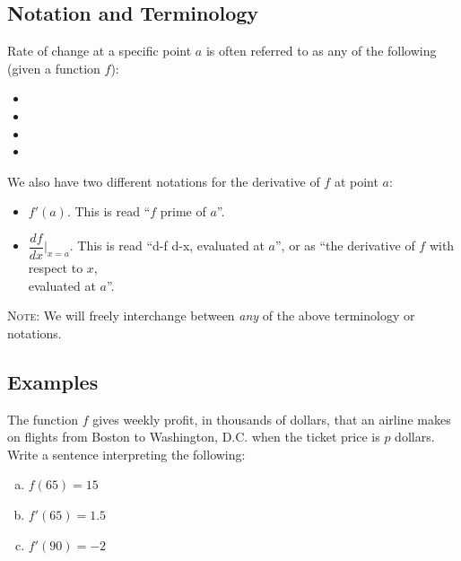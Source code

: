 \documentclass[notes]{subfiles}
\begin{document}
	\subsection*{Notation and Terminology}
		Rate of change at a specific point $a$ is often referred to as any of the following (given a function $f$):\\
			\begin{itemize}
				\item {}
				\item {}
				\item {}
				\item {}
			\end{itemize}
		We also have two different notations for the derivative of $f$ at point $a$:
			\begin{itemize}
				\item $f'(a)$.  This is read ``$f$ prime of $a$''.
				\item $\dfrac{df}{dx}\bigg|_{x = a}$.  This is read ``d-f d-x, evaluated at $a$'', or as ``the derivative of $f$ with respect to $x$,\\[5pt] evaluated at $a$''.
			\end{itemize}
				
			\textsc{Note}: We will freely interchange between \emph{any} of the above terminology or notations.
				\newpage 
				
	\subsection*{Examples}
		\begin{ex} The function $f$ gives weekly profit, in thousands of dollars, that an airline makes on flights from Boston to Washington, D.C. when the ticket price is $p$ dollars.  Write a sentence interpreting the following:
			\begin{enumerate}[(a)]
				\item $f(65)=15$
				\item $f'(65)=1.5$
				\item $f'(90) = -2$
			\end{enumerate}
		\end{ex}
		
\end{document}
